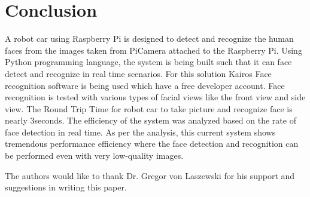 \documentclass[sigconf]{acmart}
\begin{document}
\section{Conclusion}
A robot car using Raspberry Pi is designed to detect and recognize the human faces 
from the images taken from PiCamera attached to the Raspberry Pi. Using Python 
programming language, the system is being built such that it can face detect and 
recognize in real time scenarios. For this solution Kairos Face recognition software 
is being used which have a free developer account. Face recognition is tested with 
various types of facial views like the front view and side view. The Round Trip Time 
for robot car to take picture and recognize face is nearly 3seconds. The efficiency 
of the system was analyzed based on the rate of face detection in real time. As per 
the analysis, this current system shows tremendous performance efficiency where the 
face detection and recognition can be performed even with very low-quality images.


\begin{acks}

The authors would like to thank Dr. Gregor von Laszewski for his support and suggestions 
in writing this paper.

\end{acks}


 
\end{document}
